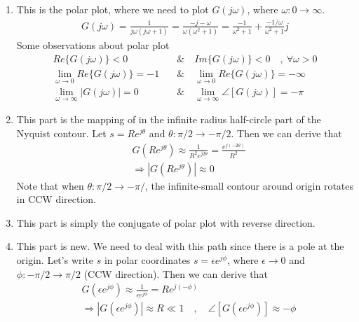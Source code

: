 \documentclass{article}
\begin{document}
\begin{enumerate}
  \item This is the polar plot, where we need to plot $G(j \omega)$, where $\omega : 0 \to
    \infty$. 
    \begin{align*}
      G(j \omega) = \frac{1}{j \omega (j \omega +1)} = \frac{ -j  - \omega }{\omega
      (\omega^2 + 1) } = \frac{-1}{\omega^2 + 1} + \frac{-1/\omega}{
      \omega^2 + 1} j
    \end{align*}
%
   Some observations about polar plot
    \begin{align*}
       Re \lbrace G(j \omega) \rbrace < 0 \quad & \&  \quad  Im \lbrace G(j
                                                \omega) \rbrace < 0 \quad , \ \forall  \omega > 0 
      \\
        \lim_{\omega \to 0} Re \lbrace G(j \omega) \rbrace = - 1
       \quad & \& \quad
       \lim_{\omega \to 0} Re \lbrace G(j \omega) \rbrace = - \infty
        \\
       \lim_{\omega \to \infty} | G(j \omega) | = 0
        \quad & \& \quad
      \lim_{\omega \to \infty} \angle [ G(j \omega) ] = -\pi
      \end{align*}
  \item This part is the mapping of in the infinite radius half-circle part of the Nyquist contour.
    Let $s = R e^{j \theta}$ and $\theta : \pi/2 \to -\pi/2$.  Then 
   we can derive that  
   \begin{align*}
     & G \left( R e^{j \theta} \right) \approx \frac{1}{R^2 e^{j
       2 \theta}} = \frac{e^{j (-2 \theta)}}{R^2}
       \\
    &\Rightarrow | G \left( R e^{j \theta} \right) | \approx 0
   \end{align*}
   Note that when $\theta : \pi/2 \to -\pi/$, the infinite-small 
   contour around origin rotates in CCW direction. 
   \item This part is simply the conjugate of polar plot with reverse
     direction. 
  \item This part is new. We need to deal with this path   since there is a pole at the origin. 
  	Let's write $s$ in polar coordinates
     $s = \epsilon e^{j \phi}$, where $\epsilon \to 0$ and $\phi :
     -\pi/2 \to \pi/2$ (CCW direction).  Then  we can derive that  
   \begin{align*}
     & G \left( \epsilon e^{j \phi} \right) \approx \frac{1}{\epsilon e^{j
        \phi}} = R e^{j (-\phi)}
       \\
    &\Rightarrow | G \left(\epsilon e^{j \phi} \right) | \approx
     R \ll 1
   \quad , \quad \angle [ G \left( \epsilon e^{j \phi} \right) ] \approx -\phi
   \end{align*}
\end{enumerate}
\end{document}
